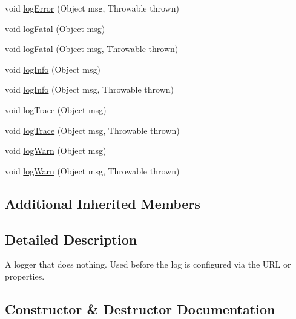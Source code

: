 \begin{DoxyCompactItemize}
\item 
void \mbox{\hyperlink{classcom_1_1mysql_1_1cj_1_1log_1_1_null_logger_a5e2cc9bc22d59ed5f1531cb73b3b48c5}{log\+Error}} (Object msg, Throwable thrown)
\item 
void \mbox{\hyperlink{classcom_1_1mysql_1_1cj_1_1log_1_1_null_logger_a68d852a1b707ebdbf2288d9e4a1c0335}{log\+Fatal}} (Object msg)
\item 
void \mbox{\hyperlink{classcom_1_1mysql_1_1cj_1_1log_1_1_null_logger_a41fac550645e2405ce00932de06fd9cb}{log\+Fatal}} (Object msg, Throwable thrown)
\item 
void \mbox{\hyperlink{classcom_1_1mysql_1_1cj_1_1log_1_1_null_logger_a26d58956fed92b00593c66b1d7d3fed0}{log\+Info}} (Object msg)
\item 
void \mbox{\hyperlink{classcom_1_1mysql_1_1cj_1_1log_1_1_null_logger_a0dc09cf6b7ae8266a850c79bc226e714}{log\+Info}} (Object msg, Throwable thrown)
\item 
void \mbox{\hyperlink{classcom_1_1mysql_1_1cj_1_1log_1_1_null_logger_a090baffde957c89a83f1941bcb7cd4d7}{log\+Trace}} (Object msg)
\item 
void \mbox{\hyperlink{classcom_1_1mysql_1_1cj_1_1log_1_1_null_logger_a49552fc2c395b97c7916eb698ddd3315}{log\+Trace}} (Object msg, Throwable thrown)
\item 
void \mbox{\hyperlink{classcom_1_1mysql_1_1cj_1_1log_1_1_null_logger_aa9e190bc8cca0fb1c78bbc3e9d05cb26}{log\+Warn}} (Object msg)
\item 
void \mbox{\hyperlink{classcom_1_1mysql_1_1cj_1_1log_1_1_null_logger_a93b1146368f2a30e7b4c74c043c4c00e}{log\+Warn}} (Object msg, Throwable thrown)
\end{DoxyCompactItemize}
\subsection*{Additional Inherited Members}


\subsection{Detailed Description}
A logger that does nothing. Used before the log is configured via the U\+RL or properties. 

\subsection{Constructor \& Destructor Documentation}
\mbox{\label{classcom_1_1mysql_1_1cj_1_1log_1_1_null_logger_ac4173d37309f6795e73b6fbbee44b5b5}} 
